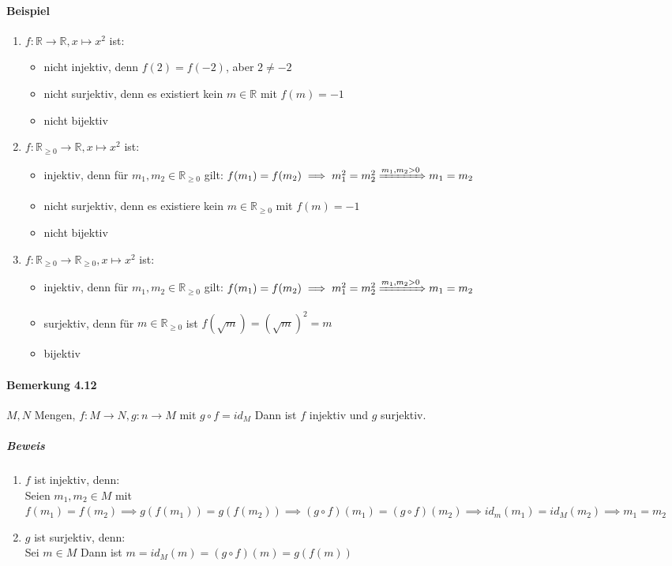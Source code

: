 \documentclass[a4paper]{scrartcl}
\theoremstyle{definition}
\theoremstyle{plain}
\theoremstyle{plain}
\theoremstyle{remark}
\theoremstyle{remark}
\theoremstyle{remark}
\theoremstyle{remark}
\theoremstyle{remark}
\begin{document}
\paragraph{Beispiel}
\label{sec-2-6-7-4}
\begin{enumerate}
\item $f:\mathbb{R}\to\mathbb{R},x\mapsto x^2$ ist:
\begin{itemize}
\item nicht injektiv, denn $f(2) = f(-2)$, aber $2\neq -2$
\item nicht surjektiv, denn es existiert kein $m\in\mathbb{R}$ mit $f(m) = -1$
\item nicht bijektiv
\end{itemize}
\item $f:\mathbb{R}_{\geq 0} \to \mathbb{R}, x\mapsto x^2$ ist:
\begin{itemize}
\item injektiv, denn für $m_1,m_2 \in\mathbb{R}_{\geq 0}$ gilt: $f(m_1) = f(m_2) \implies m_1^2 = m_2^2 \xRightarrow{m_1,m_2 > 0} m_1 = m_2$
\item nicht surjektiv, denn es existiere kein $m\in\mathbb{R}_{\geq 0}$ mit $f(m) = -1$
\item nicht bijektiv
\end{itemize}
\item $f:\mathbb{R}_{\geq 0} \to \mathbb{R}_{\geq 0}, x\mapsto x^2$ ist:
\begin{itemize}
\item injektiv, denn für $m_1,m_2 \in\mathbb{R}_{\geq 0}$ gilt: $f(m_1) = f(m_2) \implies m_1^2 = m_2^2 \xRightarrow{m_1,m_2 > 0} m_1 = m_2$
\item surjektiv, denn für $m\in\mathbb{R}_{\geq 0}$ ist $f(\sqrt{m}) = (\sqrt{m})^2 = m$
\item bijektiv
\end{itemize}
\end{enumerate}
\paragraph{Bemerkung 4.12}
\label{sec-2-6-7-5}
$M,N$ Mengen, $f:M\to N, g:n\to M$ mit $g\circ f = id_M$
Dann ist $f$ injektiv und $g$ surjektiv.
\subparagraph{Beweis}
\label{sec-2-6-7-5-1}
\begin{enumerate}
\item $f$ ist injektiv, denn: \\
                 Seien $m_1, m_2 \in M$ mit $f(m_1) = f(m_2) \implies g(f(m_1)) = g(f(m_2)) \implies (g\circ f)(m_1) = (g\circ f)(m_2) \implies id_m(m_1) = id_M(m_2)\implies m_1 = m_2$
\item $g$ ist surjektiv, denn: \\
                 Sei $m\in M$ Dann ist $m=id_M(m) = (g\circ f)(m) = g(f(m))$
\end{enumerate}
\end{document}
